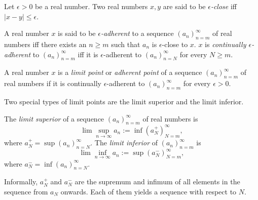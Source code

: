\begin{defn}
  Let $\epsilon>0$ be a real number.
  Two real numbers $x,y$ are said to be \emph{$\epsilon$-close}
  iff $|x-y|\le \epsilon$.
\end{defn}

\begin{defn}
  A real number $x$ is said to be \emph{$\epsilon$-adherent}
  to a sequence $(a_n)_{n=m}^{\infty}$ of real numbers
  iff there exists an $n\ge m$ such that
  $a_n$ is $\epsilon$-close to $x$.
  $x$ is \emph{continually $\epsilon$-adherent} to
  $(a_n)_{n=m}^{\infty}$
  iff it is $\epsilon$-adherent to $(a_n)_{n=N}^{\infty}$
  for every $N\ge m$.
\end{defn}

\begin{defn}
  \label{def:limitPointInR}
  A real number $x$ is a \emph{limit point} or \emph{adherent point}
  of a sequence $(a_n)_{n=m}^{\infty}$ of real numbers
  if it is continually $\epsilon$-adherent to
  $(a_n)_{n=m}^{\infty}$ for every $\epsilon> 0$.
\end{defn}

\begin{rem}
  Two special types of limit points are the limit superior
  and the limit inferior.
\end{rem}

\begin{defn}
  The \emph{limit superior} of a sequence $(a_n)_{n=m}^{\infty}$ of
  real numbers
  is
  \begin{equation}
    \label{eq:limsup}
    \lim \sup_{n\rightarrow \infty} a_n := \inf (a_N^+)_{N=m}^{\infty}, 
  \end{equation}
  where $a_N^+=\sup(a_n)_{n=N}^{\infty}$.
  The \emph{limit inferior} of $(a_n)_{n=m}^{\infty}$ is
  \begin{equation}
    \label{eq:liminf}
    \lim \inf_{n\rightarrow \infty} a_n := \sup (a_N^-)_{N=m}^{\infty}, 
  \end{equation}
  where $a_N^-=\inf(a_n)_{n=N}^{\infty}$.
\end{defn}

\begin{rem}
  Informally, $a_N^+$ and $a_N^-$ are the supremum and infimum
  of all elements in the sequence from $a_N$ onwards.
  Each of them yields a sequence with respect to $N$.
\end{rem}

